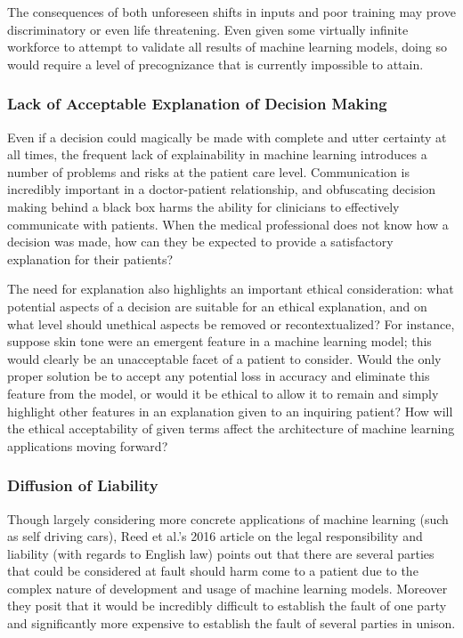 \documentclass[]{article}
\begin{document}
				The consequences of both unforeseen shifts in inputs and poor training may prove discriminatory or even life threatening. Even given some virtually infinite workforce to attempt to validate all results of machine learning models, doing so would require a level of precognizance that is currently impossible to attain.

			\subsubsection{Lack of Acceptable Explanation of Decision Making}
				Even if a decision could magically be made with complete and utter certainty at all times, the frequent lack of explainability in machine learning introduces a number of problems and risks at the patient care level. Communication is incredibly important in a doctor-patient relationship,\cite{ha2010doctor} and obfuscating decision making behind a black box harms the ability for clinicians to effectively communicate with patients. When the medical professional does not know how a decision was made, how can they be expected to provide a satisfactory explanation for their patients?

				The need for explanation also highlights an important ethical consideration: what potential aspects of a decision are suitable for an ethical explanation, and on what level should unethical aspects be removed or recontextualized? For instance, suppose skin tone were an emergent feature in a machine learning model; this would clearly be an unacceptable facet of a patient to consider. Would the only proper solution be to accept any potential loss in accuracy and eliminate this feature from the model, or would it be ethical to allow it to remain and simply highlight other features in an explanation given to an inquiring patient? How will the ethical acceptability of given terms affect the architecture of machine learning applications moving forward?

			\subsubsection{Diffusion of Liability}
				Though largely considering more concrete applications of machine learning (such as self driving cars), Reed {et al.}'s 2016 article on the legal responsibility and liability (with regards to English law) points out that there are several parties that could be considered at fault should harm come to a patient due to the complex nature of development and usage of machine learning models. Moreover they posit that it would be incredibly difficult to establish the fault of one party and significantly more expensive to establish the fault of several parties in unison.\cite{reed2016responsibility}
\end{document}
